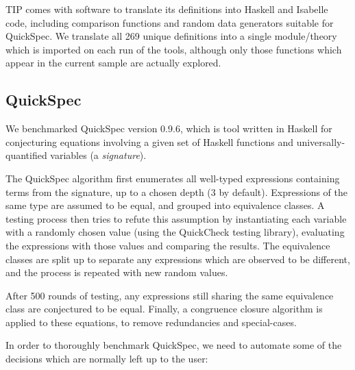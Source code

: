 TIP comes with software to translate its definitions into Haskell and Isabelle
code, including comparison functions and random data generators suitable for
QuickSpec. We translate all 269 unique definitions into a single module/theory
which is imported on each run of the tools, although only those functions which
appear in the current sample are actually explored.

\subsection{QuickSpec}

We benchmarked QuickSpec version 0.9.6, which is tool written in Haskell for
conjecturing equations involving a given set of Haskell functions and
universally-quantified variables (a \emph{signature}).

The QuickSpec algorithm first enumerates all well-typed expressions containing
terms from the signature, up to a chosen depth (3 by default). Expressions of
the same type are assumed to be equal, and grouped into equivalence classes. A
testing process then tries to refute this assumption by instantiating each
variable with a randomly chosen value (using the QuickCheck testing library),
evaluating the expressions with those values and comparing the results. The
equivalence classes are split up to separate any expressions which are observed
to be different, and the process is repeated with new random values.

After 500 rounds of testing, any expressions still sharing the same equivalence
class are conjectured to be equal. Finally, a congruence closure algorithm is
applied to these equations, to remove redundancies and special-cases.

In order to thoroughly benchmark QuickSpec, we need to automate some of the
decisions which are normally left up to the user:

